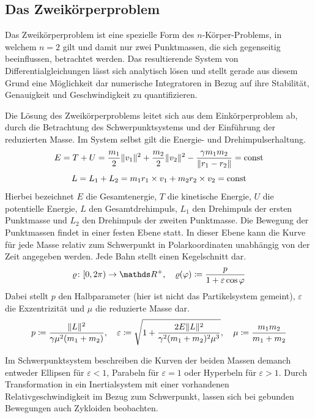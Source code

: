
  \subsection{Das Zweikörperproblem} %
  \label{sub:das_zweikoerperproblem}

    Das Zweikörperproblem ist eine spezielle Form des $n$-Körper-Problems, in welchem $n=2$ gilt und damit nur zwei Punktmassen, die sich gegenseitig beeinflussen, betrachtet werden.
    Das resultierende System von Differentialgleichungen lässt sich analytisch lösen und stellt gerade aus diesem Grund eine Möglichkeit dar numerische Integratoren in Bezug auf ihre Stabilität, Genauigkeit und Geschwindigkeit zu quantifizieren.

    Die Lösung des Zweikörperproblems leitet sich aus dem Einkörperproblem ab, durch die Betrachtung des Schwerpunktsystems und der Einführung der reduzierten Masse.
    Im System selbst gilt die Energie- und Drehimpulserhaltung.
    \[
      E = T + U = \frac{m_1}{2}\|v_1\|^2 + \frac{m_2}{2}\|v_2\|^2 - \frac{\gamma m_1m_2}{\|r_1-r_2\|} = \mathrm{const}
    \]
    \[
      L = L_1 + L_2 = m_1r_1\times v_1 + m_2r_2\times v_2 = \mathrm{const}
    \]
    Hierbei bezeichnet $E$ die Gesamtenergie, $T$ die kinetische Energie, $U$ die potentielle Energie, $L$ den Gesamtdrehimpuls, $L_1$ den Drehimpuls der ersten Punktmasse und $L_2$ den Drehimpuls der zweiten Punktmasse.
    Die Bewegung der Punktmassen findet in einer festen Ebene statt.
    In dieser Ebene kann die Kurve für jede Masse relativ zum Schwerpunkt in Polarkoordinaten unabhängig von der Zeit angegeben werden.
    Jede Bahn stellt einen Kegelschnitt dar.
    \[
      \function{\varrho}{[0,2\pi)}{\setReal^+}
      \separate
      \varrho(\varphi) \define \frac{p}{1+\varepsilon \cos \varphi}
    \]
    Dabei stellt $p$ den Halbparameter (hier ist nicht das Partikelsystem gemeint), $\varepsilon$ die Exzentrizität und $\mu$ die reduzierte Masse dar.
    \[
      p \coloneqq \frac{\|L\|^2}{\gamma \mu^2(m_1+m_2)}
      ,\quad
      \varepsilon \coloneqq \sqrt{1 + \frac{2E\|L\|^2}{\gamma^2(m_1+m_2)^2\mu^3}}
      ,\quad
      \mu \coloneqq \frac{m_1m_2}{m_1+m_2}
    \]

    Im Schwerpunktsystem beschreiben die Kurven der beiden Massen demanch entweder Ellipsen für $\varepsilon < 1$, Parabeln für $\varepsilon = 1$ oder Hyperbeln für $\varepsilon > 1$.
    Durch Transformation in ein Inertialsystem mit einer vorhandenen Relativgeschwindigkeit im Bezug zum Schwerpunkt, lassen sich bei gebunden Bewegungen auch Zykloiden beobachten.

